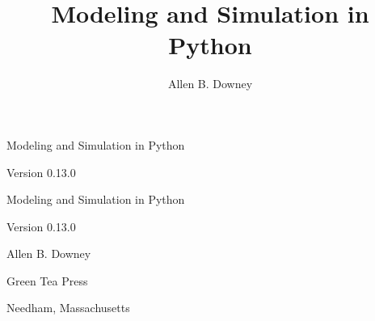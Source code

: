 \documentclass[12pt]{book}
\title{Modeling and Simulation in Python}
\author{Allen B. Downey}
\newcommand{\thetitle}{Modeling and Simulation in Python}
\newcommand{\theauthors}{Allen B. Downey}
\newcommand{\theversion}{0.13.0}
\theoremstyle{exercise}
\newcommand\blankpage{%
    \null
    \thispagestyle{empty}%
    \addtocounter{page}{-1}%
    \newpage}
\newif\ifplastex
\begin{document}
\frontmatter

\ifplastex

\maketitle

\else

\begin{latexonly}

\thispagestyle{empty}

\begin{flushright}
\vspace*{2.0in}

\begin{spacing}{3}
{\huge \thetitle}
\end{spacing}

\vspace{0.25in}

Version \theversion

\vfill

\end{flushright}


\afterpage{\blankpage}


\pagebreak
\thispagestyle{empty}

\begin{flushright}
\vspace*{2.0in}

\begin{spacing}{3}
{\huge \thetitle}
\end{spacing}

\vspace{0.25in}

Version \theversion

\vspace{1in}


{\Large
\theauthors \\
}


\vspace{0.5in}

{\Large Green Tea Press}

{\small Needham, Massachusetts}


\end{flushright}
\end{latexonly}
\end{document}

